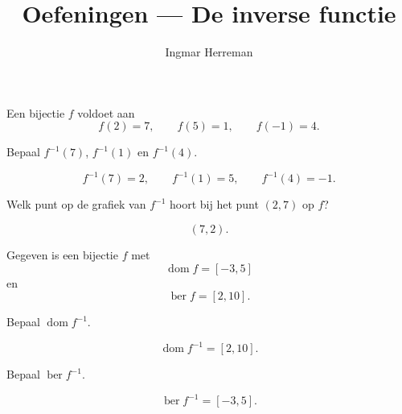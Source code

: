 \documentclass{ximera}
\title{Oefeningen — De inverse functie}
\author{Ingmar Herreman}
\begin{document}









\maketitle
\FVDbeginExercises



\begin{oefening}{\oefB\ESS}

Een bijectie \(f\) voldoet aan
\[
f(2)=7,\qquad f(5)=1,\qquad f(-1)=4.
\]

\begin{question}
Bepaal \(f^{-1}(7)\), \(f^{-1}(1)\) en \(f^{-1}(4)\).

\begin{oplossing}
\[
f^{-1}(7)=2,\qquad
f^{-1}(1)=5,\qquad
f^{-1}(4)=-1.
\]
\end{oplossing}
\end{question}

\begin{question}
Welk punt op de grafiek van \(f^{-1}\) hoort bij het punt \((2,7)\) op \(f\)?

\begin{oplossing}
\[
(7,2).
\]
\end{oplossing}
\end{question}

\end{oefening}

\begin{oefening}{\oefB\ESS}

Gegeven is een bijectie \(f\) met
\[
\operatorname{dom}f=[-3,5]
\]
en
\[
\operatorname{ber}f=[2,10].
\]

\begin{question}
Bepaal \(\operatorname{dom}f^{-1}\).

\begin{oplossing}
\[
\operatorname{dom}f^{-1}=[2,10].
\]
\end{oplossing}
\end{question}

\begin{question}
Bepaal \(\operatorname{ber}f^{-1}\).

\begin{oplossing}
\[
\operatorname{ber}f^{-1}=[-3,5].
\]
\end{oplossing}
\end{question}

\end{oefening}
\end{document}
